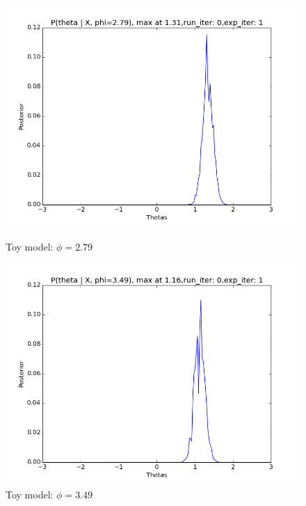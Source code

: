 \documentclass[10pt,journal,compsoc]{IEEEtran}
\begin{document}
\begin{figure}
\begin{minipage}[b]{0.5\linewidth}
\includegraphics[width=1\linewidth]{images/LP4.png} 
\caption{\label{fig:LP4}Toy model: $\phi=2.79$}
\end{minipage} 		
\begin{minipage}[b]{0.5\linewidth}
\centering
\includegraphics[width=1\linewidth]{images/LP5.png} 
\caption{\label{fig:LP5}Toy model: $\phi=3.49$}
\end{minipage} 

\end{figure}
\end{document}
